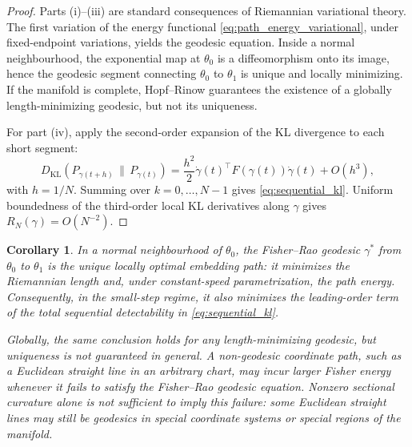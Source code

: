 \documentclass[a4paper,fleqn]{cas-dc}
\newtheorem{corollary}{Corollary}
\newcommand{\DKL}{D_{\mathrm{KL}}}
\begin{document}
\begin{proof}
  Parts (i)--(iii) are standard consequences of Riemannian variational
  theory.  The first variation of the energy functional
  \eqref{eq:path_energy_variational}, under fixed-endpoint variations,
  yields the geodesic equation.  Inside a normal neighbourhood, the
  exponential map at $\theta_0$ is a diffeomorphism onto its image, hence
  the geodesic segment connecting $\theta_0$ to $\theta_1$ is unique and
  locally minimizing.  If the manifold is complete, Hopf--Rinow guarantees
  the existence of a globally length-minimizing geodesic, but not its
  uniqueness.

  For part (iv), apply the second-order expansion of the KL divergence to
  each short segment:
  \[
    \DKL\!\left(
      P_{\gamma(t+h)}
      \,\|\,
      P_{\gamma(t)}
    \right)
    =
    \frac{h^2}{2}
    \dot\gamma(t)^\top F(\gamma(t))\dot\gamma(t)
    +
    O(h^3),
  \]
  with $h=1/N$.  Summing over $k=0,\ldots,N-1$ gives
  \eqref{eq:sequential_kl}.  Uniform boundedness of the third-order local
  KL derivatives along $\gamma$ gives $R_N(\gamma)=O(N^{-2})$.
\end{proof}

\begin{corollary}
  \label{cor:geodesic_optimality}
  In a normal neighbourhood of $\theta_0$, the Fisher--Rao geodesic
  $\gamma^*$ from $\theta_0$ to $\theta_1$ is the unique locally optimal
  embedding path: it minimizes the Riemannian length and, under
  constant-speed parametrization, the path energy.  Consequently, in the
  small-step regime, it also minimizes the leading-order term of the total
  sequential detectability in \eqref{eq:sequential_kl}.

  Globally, the same conclusion holds for any length-minimizing geodesic,
  but uniqueness is not guaranteed in general.  A non-geodesic coordinate
  path, such as a Euclidean straight line in an arbitrary chart, may incur
  larger Fisher energy whenever it fails to satisfy the Fisher--Rao
  geodesic equation.  Nonzero sectional curvature alone is not sufficient
  to imply this failure: some Euclidean straight lines may still be
  geodesics in special coordinate systems or special regions of the
  manifold.
\end{corollary}
\end{document}
